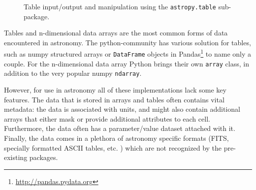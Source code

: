 \documentclass[traditabstract]{aa}
\begin{document}
\begin{figure}
\center
\caption{Table input/output and manipulation using the \texttt{astropy.table} sub-package.\label{code:tables}}
\vspace{0.1in}
\end{figure}

Tables and n-dimensional data arrays are the most common forms of data
encountered in astronomy. The \gls{python}-community has various solution for
tables, such as \gls{numpy} structured arrays or \texttt{DataFrame} objects in
Pandas\footnote{\url{http://pandas.pydata.org}} to name only a couple. For the
n-dimensional data array Python brings their own \texttt{array} class, in
addition to the very popular \gls{numpy} \texttt{ndarray}.

However, for use in astronomy all of these implementations lack some key
features. The data that is stored in arrays and tables often contains
vital metadata: the data is associated with units, and might also contain
additional arrays that either mask or provide additional attributes to each
cell. Furthermore, the data often has a parameter/value dataset attached with
it. Finally, the data comes in a plethora of astronomy specific formats (FITS,
specially formatted ASCII tables, etc. ) which are not recognized by the
pre-existing packages.
\end{document}
